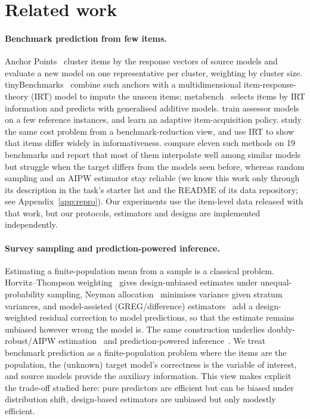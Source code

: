 \section{Related work}\label{sec:related}
\paragraph{Benchmark prediction from few items.}
Anchor Points~\citep{vivek2024anchor} cluster items by the response vectors of source models and evaluate a new model on one representative per cluster, weighting by cluster size. tinyBenchmarks~\citep{polo2024tiny} combine such anchors with a multidimensional item-response-theory (IRT) model to impute the unseen items; metabench~\citep{kipnis2025metabench} selects items by IRT information and predicts with generalised additive models. \citet{pacchiardi2024100} train assessor models on a few reference instances, and \citet{li2025active} learn an adaptive item-acquisition policy. \citet{perlitz2024efficient} study the same cost problem from a benchmark-reduction view, and \citet{rodriguez2021evaluation} use IRT to show that items differ widely in informativeness. \citet{zhang2025misses} compare eleven such methods on 19 benchmarks and report that most of them interpolate well among similar models but struggle when the target differs from the models seen before, whereas random sampling and an AIPW estimator stay reliable (we know this work only through its description in the task's starter list and the README of its data repository; see Appendix~\ref{app:repro}). Our experiments use the item-level data released with that work, but our protocols, estimators and designs are implemented independently.

\paragraph{Survey sampling and prediction-powered inference.}
Estimating a finite-population mean from a sample is a classical problem. Horvitz--Thompson weighting~\citep{horvitz1952generalization} gives design-unbiased estimates under unequal-probability sampling, Neyman allocation~\citep{neyman1934two} minimises variance given stratum variances, and model-assisted (GREG/difference) estimators~\citep{sarndal1992model} add a design-weighted residual correction to model predictions, so that the estimate remains unbiased however wrong the model is. The same construction underlies doubly-robust/AIPW estimation~\citep{robins1994estimation} and prediction-powered inference~\citep{angelopoulos2023ppi}. We treat benchmark prediction as a finite-population problem where the items are the population, the (unknown) target model's correctness is the variable of interest, and source models provide the auxiliary information. This view makes explicit the trade-off studied here: pure predictors are efficient but can be biased under distribution shift, design-based estimators are unbiased but only modestly efficient.

